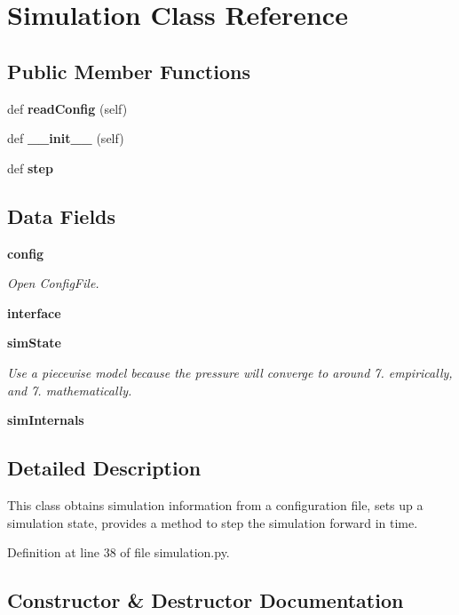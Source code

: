 \section{Simulation Class Reference}
\label{classsims_1_1rtupipe_1_1simulation_1_1_simulation}
\subsection*{Public Member Functions}
\begin{DoxyCompactItemize}
\item 
def {\bf read\+Config} (self)
\item 
def {\bf \+\_\+\+\_\+init\+\_\+\+\_\+} (self)
\item 
def {\bf step}
\end{DoxyCompactItemize}
\subsection*{Data Fields}
\begin{DoxyCompactItemize}
\item 
{\bf config}
\begin{DoxyCompactList}\small\item\em Open Config\+File. \end{DoxyCompactList}\item 
{\bf interface}
\item 
{\bf sim\+State}
\begin{DoxyCompactList}\small\item\em Use a piecewise model because the pressure will converge to around 7. empirically, and 7. mathematically. \end{DoxyCompactList}\item 
{\bf sim\+Internals}
\end{DoxyCompactItemize}


\subsection{Detailed Description}
\begin{DoxyVerb}This class obtains simulation information from a configuration file,
    sets up a simulation state, provides a method to step the simulation
    forward in time.\end{DoxyVerb}
 

Definition at line 38 of file simulation.\+py.



\subsection{Constructor \& Destructor Documentation}
